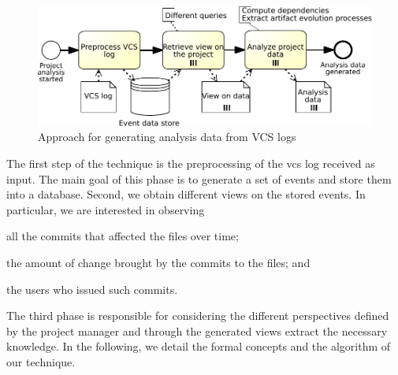 \begin{figure}[h]
	\centering
	\includegraphics[width=.9\textwidth]{bpm2017/figures/visualization-process-crop}
	\caption[Approach for generating analysis data from VCS logs]{Approach for generating analysis data from VCS logs}
	\label{fig:visualization-process}
\end{figure}

The first step of the technique is the preprocessing of the \gls{vcs} log received as input. The main goal of this phase is to generate a set of events and store them into a database. Second, we obtain different views on the stored events. In particular, we are interested in observing
\begin{inparaenum}[\itshape i)]
	\item all the commits that affected the files over time;
	\item the amount of change brought by the commits to the files; and
	\item the users who issued such commits.
\end{inparaenum}
The third phase is responsible for considering the different perspectives defined by the project manager and through the generated views extract the necessary knowledge. In the following, we detail the formal concepts and the algorithm of our technique.



%





%


%

%

